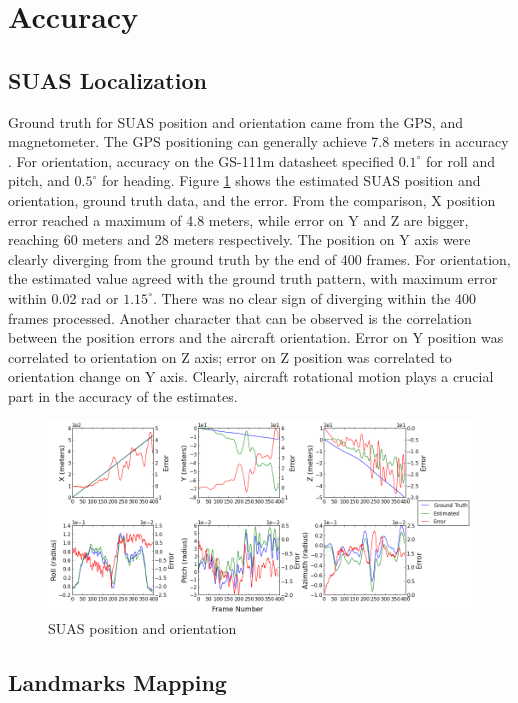\section{Accuracy}\label{sec:flight-accuracy}
\subsection{SUAS Localization}

Ground truth for SUAS position and orientation came from the GPS, and
magnetometer. The GPS positioning can generally achieve 7.8 meters in
accuracy \cite{_gps_????}. For orientation, accuracy on the GS-111m
datasheet specified $0.1^{\circ}$ for roll and pitch, and
$0.5^{\circ}$ for heading. Figure \ref{fltfig:6} shows the estimated
SUAS position and orientation, ground truth data, and the error. From
the comparison, X position error reached a maximum of 4.8 meters,
while error on Y and Z are bigger, reaching 60 meters and 28 meters
respectively. The position on Y axis were clearly diverging from the
ground truth by the end of 400 frames. For orientation, the estimated
value agreed with the ground truth pattern, with maximum error within
0.02 rad or $1.15^{\circ}$. There was no clear sign of diverging
within the 400 frames processed. Another character that can be
observed is the correlation between the position errors and the
aircraft orientation. Error on Y position was correlated to
orientation on Z axis; error on Z position was correlated to
orientation change on Y axis. Clearly, aircraft rotational motion
plays a crucial part in the accuracy of the estimates.

\begin{figure}[h]
\centering
\includegraphics[width=15.5cm, keepaspectratio=true]
{./Figures/fltfig/cut1/Figure30.png}
\caption{SUAS position and orientation}
\label{fltfig:6}
\end{figure}
\FloatBarrier
\subsection{Landmarks Mapping}\label{sec:accuracy_features}

